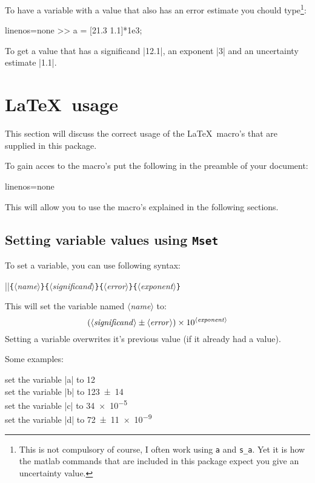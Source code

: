 \documentclass[a4paper,10pt]{article}
\makeatletter
\newcommand\argu[1]{{\color{black}$\langle$\textit{#1}$\rangle$}}
\newcommand\ARGU[1]{\texttt{\{}\argu{#1}\texttt{\}}}
\newcommand\co[0]{\color{violet}}
\newcommand\mtmrg[1]{\marginpar{\texttt{#1}}}
\newcommand\mrg[1]{\index{#1@\texttt{\textbackslash #1}}\mtmrg{\textbackslash #1}}
\makeatother
\begin{document}
To have a variable with a value that also has an error estimate you chould type\footnote{This is not compulsory of course, I often work using \texttt{a} and \texttt{s\_a}. Yet it is how the matlab commands that are included in this package expect you give an uncertainty value.}:
\begin{center}
	\begin{matlabcode*}{linenos=none}
		>> a = [21.3 1.1]*1e3;
	\end{matlabcode*}
\end{center}
To get a value that has a significand |12.1|, an exponent |3| and an uncertainty estimate |1.1|.



\section{\LaTeX\ usage}
This section will discuss the correct usage of the \LaTeX\ macro's that are supplied in this package.

To gain acces to the macro's put the following in the preamble of your document:
\begin{center}
	\begin{texcode*}{linenos=none}
		\usepackage{mattex}
	\end{texcode*}
\end{center}
This will allow you to use the macro's explained in the following sections.

\subsection{Setting variable values using \texttt{Mset}}
To set a variable,  you can use following syntax:

{\co|\Mset|\ARGU{name}\ARGU{significand}\ARGU{error}\ARGU{exponent}}

\mrg{Mset}
This will set the variable named \argu{name} to:
\[ 
	(\text{\argu{significand}} \pm \text{\argu{error}}) \times 10^{\text{\argu{exponent}}}
\]
Setting a variable overwrites it's previous value (if it already had a value).

Some examples:

\begin{minipage}[t]{0.45\textwidth}
	\begin{texcode}
	\end{texcode}
\end{minipage}\hfil
\begin{minipage}[c]{0.50\textwidth}
\vspace{9pt}
set the variable |a| to \num{12}\\
set the variable |b| to \SI{123+-14}{}\\
set the variable |c| to \SI{34e-5}{}\\
set the variable |d| to \SI{72+-11e-9}{}\\
\end{minipage}
\end{document}
